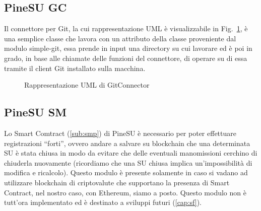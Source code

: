 \subsection{PineSU GC}

Il connettore per Git, la cui rappresentazione UML è visualizzabile in Fig.~\ref{fi:umlGC},
è una semplice classe che lavora con un attributo della classe proveniente
dal modulo simple-git, essa prende in input una directory su cui lavorare
ed è poi in grado, in base alle chiamate delle funzioni del connettore, di operare su di
essa tramite il client Git installato sulla macchina.

\begin{figure}[H]
    \centering
    \caption{Rappresentazione UML di GitConnector}
    \label{fi:umlGC}
\end{figure}

\subsection{PineSU SM}
\label{sub:sm}
Lo Smart Comtract (\autoref{sub:smp}) di PineSU è necessario
per poter effettuare registrazioni “forti”, ovvero andare a salvare su blockchain
che una determinata SU è stata chiusa in modo da evitare che delle eventuali manomissioni
cerchino di chiuderla nuovamente (ricordiamo che una SU chiusa implica un’impossibilità di modifica e ricalcolo).
Questo modulo è presente solamente in caso si vadano ad utilizzare blockchain di criptovalute che
supportano la presenza di Smart Contract, nel nostro caso, con Ethereum, siamo a posto.
Questo modulo non è tutt’ora implementato ed è destinato a sviluppi futuri (\autoref{cap:sf}).


